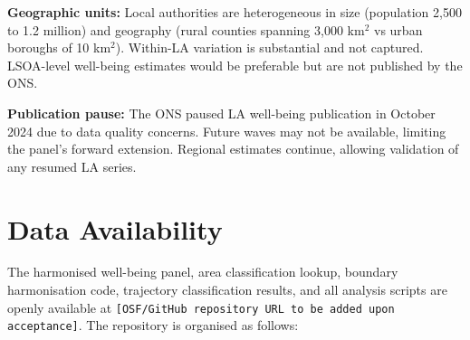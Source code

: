 \documentclass[12pt,a4paper]{article}
\begin{document}
\textbf{Geographic units:} Local authorities are heterogeneous in size (population 2,500 to 1.2 million) and geography (rural counties spanning 3,000 km$^2$ vs urban boroughs of 10 km$^2$). Within-LA variation is substantial and not captured. LSOA-level well-being estimates would be preferable but are not published by the ONS.

\textbf{Publication pause:} The ONS paused LA well-being publication in October 2024 due to data quality concerns. Future waves may not be available, limiting the panel's forward extension. Regional estimates continue, allowing validation of any resumed LA series.

\section{Data Availability}

The harmonised well-being panel, area classification lookup, boundary harmonisation code, trajectory classification results, and all analysis scripts are openly available at \texttt{[OSF/GitHub repository URL to be added upon acceptance]}. The repository is organised as follows:
\end{document}
